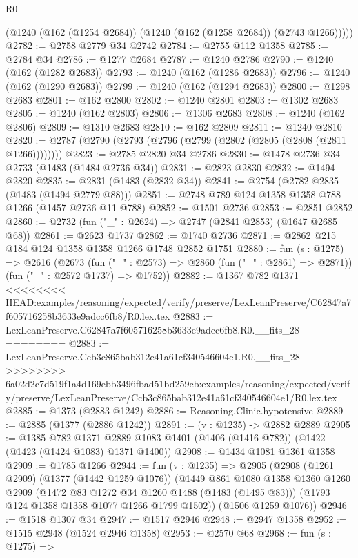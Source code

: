 \begin{lexlean}{R0}
\begin{coremodule}
{{{{{{{{{{{{{{{{{{{{{{{{{{{{{{{{{{{{{{{{{{{{{{{{{{{{{{{{{{{{{{{{{{{{{{{{{{{{{{{{{{{{{{        (@1240 (@162 (@1254 @2684)) (@1240 (@162 (@1258 @2684)) (@2743 @1266)))))
@2782 := @2758 @2779 @34 @2742
@2784 := @2755 @112 @1358
@2785 := @2784 @34
@2786 := @1277 @2684
@2787 := @1240 @2786
@2790 := @1240 (@162 (@1282 @2683))
@2793 := @1240 (@162 (@1286 @2683))
@2796 := @1240 (@162 (@1290 @2683))
@2799 := @1240 (@162 (@1294 @2683))
@2800 := @1298 @2683
@2801 := @162 @2800
@2802 := @1240 @2801
@2803 := @1302 @2683
@2805 := @1240 (@162 @2803)
@2806 := @1306 @2683
@2808 := @1240 (@162 @2806)
@2809 := @1310 @2683
@2810 := @162 @2809
@2811 := @1240 @2810
@2820 := @2787 (@2790 (@2793 (@2796 (@2799 (@2802 (@2805 (@2808 (@2811 @1266))))))))
@2823 := @2785 @2820 @34 @2786
@2830 := @1478 @2736 @34 @2733 (@1483 (@1484 @2736 @34))
@2831 := @2823 @2830
@2832 := @1494 @2820
@2835 := @2831 (@1483 (@2832 @34))
@2841 := @2754 (@2782 @2835 (@1483 (@1494 @2779 @88)))
@2851 := @2748 @789 @124 @1358 @1358 @788 @1266 (@1457 @2736 @11 @788)
@2852 := @1501 @2736
@2853 := @2851 @2852
@2860 := @2732 (fun ("_" : @2624) => @2747 (@2841 @2853) (@1647 @2685 @68))
@2861 := @2623 @1737
@2862 := @1740 @2736
@2871 := @2862 @215 @184 @124 @1358 @1358 @1266 @1748 @2852 @1751
@2880 := fun (s : @1275) =>
  @2616
    (@2673
      (fun ("_" : @2573) => @2860 (fun ("_" : @2861) => @2871))
      (fun ("_" : @2572 @1737) => @1752))
@2882 := @1367 @782 @1371
<<<<<<<< HEAD:examples/reasoning/expected/verify/preserve/LexLeanPreserve/C62847a7f605716258b3633e9adcc6fb8/R0.lex.tex
@2883 := LexLeanPreserve.C62847a7f605716258b3633e9adcc6fb8.R0.__fits_28
========
@2883 := LexLeanPreserve.Ccb3c865bab312e41a61cf340546604e1.R0.__fits_28
>>>>>>>> 6a02d2c7d519f1a4d169ebb3496fbad51bd259cb:examples/reasoning/expected/verify/preserve/LexLeanPreserve/Ccb3c865bab312e41a61cf340546604e1/R0.lex.tex
@2885 := @1373 (@2883 @1242)
@2886 := Reasoning.Clinic.hypotensive
@2889 := @2885 (@1377 (@2886 @1242))
@2891 := (v : @1235) -> @2882 @2889
@2905 := @1385
    @782
    @1371
    @2889
    @1083
    @1401
    (@1406 (@1416 @782))
    (@1422 (@1423 (@1424 @1083) @1371 @1400))
@2908 := @1434 @1081 @1361 @1358
@2909 := @1785 @1266
@2944 := fun (v : @1235) =>
  @2905
    (@2908
      (@1261 @2909)
      (@1377 (@1442 @1259 @1076))
      (@1449
        @861
        @1080
        @1358
        @1360
        @1260
        @2909
        (@1472 @83 @1272 @34 @1260 @1488 (@1483 (@1495 @83)))
        (@1793 @124 @1358 @1358 @1077 @1266 @1799 @1502))
      (@1506 @1259 @1076))
@2946 := @1518 @1307 @34
@2947 := @1517 @2946
@2948 := @2947 @1358
@2952 := @1515 @2948 (@1524 @2946 @1358)
@2953 := @2570 @68
@2968 := fun (s : @1275) =>
}}}}}}}}}}}}}}}}}}}}}}}}}}}}}}}}}}}}}}}}}}}}}}}}}}}}}}}}}}}}}}}}}}}}}}}}}}}}}}}}}}}}}}
\end{coremodule}
\end{lexlean}
